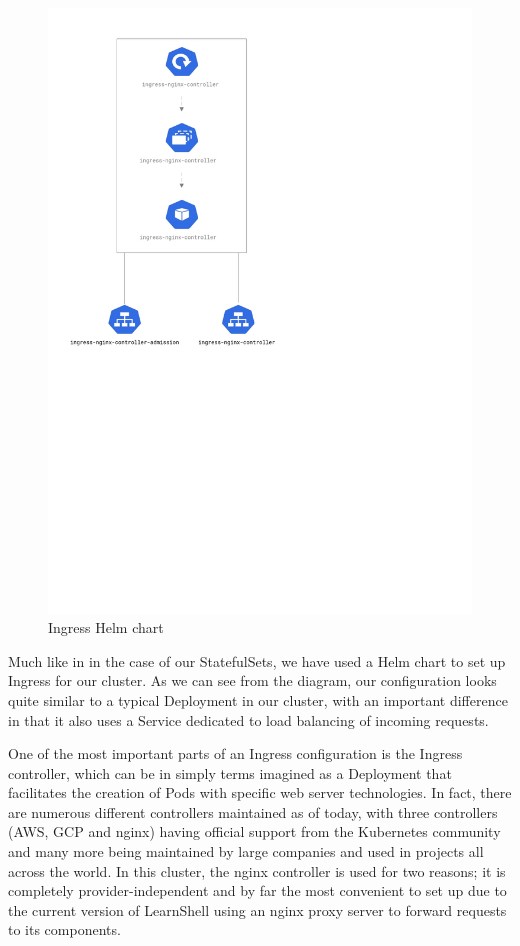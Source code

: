 \documentclass[thesis=B,english]{FITthesis}[2019/12/23]
\begin{document}
\begin{figure}[H]
\centering
\caption{Ingress Helm chart}
\hspace*{1cm}
\includegraphics[scale=0.5]{ingress-diagram}
\end{figure}

Much like in in the case of our StatefulSets, we have used a Helm chart to set up Ingress for our cluster. As we can see from the diagram, our configuration looks quite similar to a typical Deployment in our cluster, with an important difference in that it also uses a Service dedicated to load balancing of incoming requests.

One of the most important parts of an Ingress configuration is the Ingress controller, which can be in simply terms imagined as a Deployment that facilitates the creation of Pods with specific web server technologies. In fact, there are numerous different controllers maintained as of today, with three controllers (AWS, GCP and nginx) having official support from the Kubernetes community and many more being maintained by large companies and used in projects all across the world. In this cluster, the nginx controller is used for two reasons; it is completely provider-independent and by far the most convenient to set up due to the current version of LearnShell using an nginx proxy server to forward requests to its components.
\end{document}
